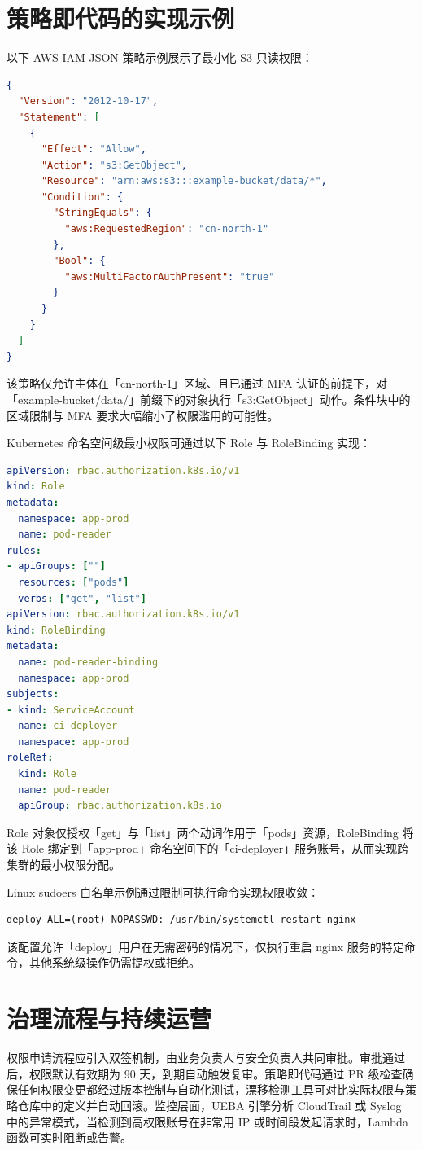 \chapter{策略即代码的实现示例}
以下 AWS IAM JSON 策略示例展示了最小化 S3 只读权限：\par
\begin{lstlisting}[language=json]
{
  "Version": "2012-10-17",
  "Statement": [
    {
      "Effect": "Allow",
      "Action": "s3:GetObject",
      "Resource": "arn:aws:s3:::example-bucket/data/*",
      "Condition": {
        "StringEquals": {
          "aws:RequestedRegion": "cn-north-1"
        },
        "Bool": {
          "aws:MultiFactorAuthPresent": "true"
        }
      }
    }
  ]
}
\end{lstlisting}
该策略仅允许主体在「cn-north-1」区域、且已通过 MFA 认证的前提下，对「example-bucket/data/」前缀下的对象执行「s3:GetObject」动作。条件块中的区域限制与 MFA 要求大幅缩小了权限滥用的可能性。\par
Kubernetes 命名空间级最小权限可通过以下 Role 与 RoleBinding 实现：\par
\begin{lstlisting}[language=yaml]
apiVersion: rbac.authorization.k8s.io/v1
kind: Role
metadata:
  namespace: app-prod
  name: pod-reader
rules:
- apiGroups: [""]
  resources: ["pods"]
  verbs: ["get", "list"]
apiVersion: rbac.authorization.k8s.io/v1
kind: RoleBinding
metadata:
  name: pod-reader-binding
  namespace: app-prod
subjects:
- kind: ServiceAccount
  name: ci-deployer
  namespace: app-prod
roleRef:
  kind: Role
  name: pod-reader
  apiGroup: rbac.authorization.k8s.io
\end{lstlisting}
Role 对象仅授权「get」与「list」两个动词作用于「pods」资源，RoleBinding 将该 Role 绑定到「app-prod」命名空间下的「ci-deployer」服务账号，从而实现跨集群的最小权限分配。\par
Linux sudoers 白名单示例通过限制可执行命令实现权限收敛：\par
\begin{lstlisting}[language=text]
deploy ALL=(root) NOPASSWD: /usr/bin/systemctl restart nginx
\end{lstlisting}
该配置允许「deploy」用户在无需密码的情况下，仅执行重启 nginx 服务的特定命令，其他系统级操作仍需提权或拒绝。\par
\chapter{治理流程与持续运营}
权限申请流程应引入双签机制，由业务负责人与安全负责人共同审批。审批通过后，权限默认有效期为 90 天，到期自动触发复审。策略即代码通过 PR 级检查确保任何权限变更都经过版本控制与自动化测试，漂移检测工具可对比实际权限与策略仓库中的定义并自动回滚。监控层面，UEBA 引擎分析 CloudTrail 或 Syslog 中的异常模式，当检测到高权限账号在非常用 IP 或时间段发起请求时，Lambda 函数可实时阻断或告警。\par

